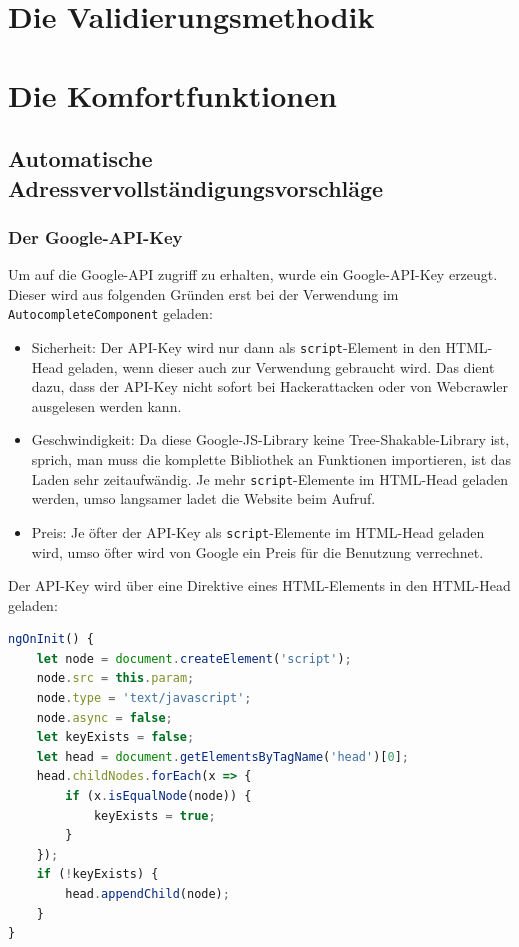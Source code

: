 \section{Die Validierungsmethodik}











\section{Die Komfortfunktionen}
\subsection{Automatische Adressvervollständigungsvorschläge}
\subsubsection{Der Google-API-Key}
Um auf die Google-API zugriff zu erhalten, wurde ein Google-API-Key erzeugt. Dieser wird aus folgenden Gründen erst bei der Verwendung im \texttt{AutocompleteComponent} geladen:

\begin{itemize}
	
	\item Sicherheit: Der API-Key wird nur dann als \texttt{script}-Element in den HTML-Head geladen, wenn dieser auch zur Verwendung gebraucht wird. Das dient dazu, dass der API-Key nicht sofort bei Hackerattacken oder von Webcrawler ausgelesen werden kann.
	
	\item Geschwindigkeit: Da diese Google-JS-Library keine Tree-Shakable-Library ist, sprich, man muss die komplette Bibliothek an Funktionen importieren, ist das Laden sehr zeitaufwändig. Je mehr \texttt{script}-Elemente im HTML-Head geladen werden, umso langsamer ladet die Website beim Aufruf.
	
	\item Preis: Je öfter der API-Key als \texttt{script}-Elemente im HTML-Head geladen wird, umso öfter wird von Google ein Preis für die Benutzung verrechnet.
\end{itemize}

Der API-Key wird über eine Direktive eines HTML-Elements in den HTML-Head geladen:

\begin{lstlisting}[caption={Die \texttt{ngOnInit()}-Methode der \texttt{LoadScriptDirective}}, language=JavaScript,label={lst:gpac}]
ngOnInit() {
	let node = document.createElement('script');
	node.src = this.param;
	node.type = 'text/javascript';
	node.async = false;
	let keyExists = false;
	let head = document.getElementsByTagName('head')[0];
	head.childNodes.forEach(x => {
		if (x.isEqualNode(node)) {
			keyExists = true;
		}
	});
	if (!keyExists) {
		head.appendChild(node);
	}
}
\end{lstlisting}

